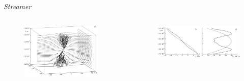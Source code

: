 \documentclass{beamer}
\begin{document}
\begin{frame}{\textit{Streamer}}
	\begin{columns}
		\begin{column}{0.33\textwidth}
			\begin{figure}
				\centering
				\includegraphics[width=0.9\textwidth]{imagens_artigo/9.png}
			\end{figure}
		\end{column}
		\begin{column}{0.67\textwidth}
			\begin{figure}
				\centering
				\includegraphics[width=0.9\linewidth]{imagens_artigo/9b}
				\label{fig:9b}
			\end{figure}
			
		\end{column}
	\end{columns}
\end{frame}
\end{document}
